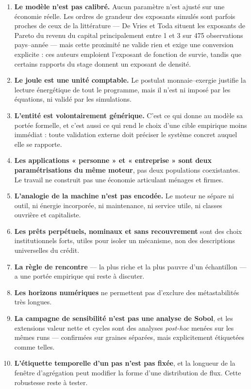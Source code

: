 \documentclass[11pt,a4paper]{article}
\begin{document}
\begin{enumerate}
\item \textbf{Le modèle n'est pas calibré.} Aucun paramètre n'est ajusté sur
      une économie réelle. Les ordres de grandeur des exposants simulés sont
      parfois proches de ceux de la littérature --- De Vries et Toda situent
      les exposants de Pareto du revenu du capital principalement entre 1 et 3
      sur 475 observations pays--année --- mais cette proximité ne valide rien
      et exige une conversion explicite : ces auteurs emploient l'exposant de
      fonction de survie, tandis que certains rapports du stage donnent un
      exposant de densité.
\item \textbf{Le joule est une unité comptable.} Le postulat monnaie--exergie
      justifie la lecture énergétique de tout le programme, mais il n'est ni
      imposé par les équations, ni validé par les simulations.
\item \textbf{L'entité est volontairement générique.} C'est ce qui donne au
      modèle sa portée formelle, et c'est aussi ce qui rend le choix d'une
      cible empirique moins immédiat : toute validation externe doit préciser
      le système concret auquel elle se rapporte.
\item \textbf{Les applications « personne » et « entreprise » sont deux
      paramétrisations du même moteur}, pas deux populations coexistantes. Le
      travail ne construit pas une économie articulant ménages et firmes.
\item \textbf{L'analogie de la machine n'est pas encodée.} Le moteur ne sépare
      ni outil, ni énergie incorporée, ni maintenance, ni service utile, ni
      classes ouvrière et capitaliste.
\item \textbf{Les prêts perpétuels, nominaux et sans recouvrement} sont des
      choix institutionnels forts, utiles pour isoler un mécanisme, non des
      descriptions universelles du crédit.
\item \textbf{La règle de rencontre} --- la plus riche et la plus pauvre d'un
      échantillon --- a une portée empirique qui reste à discuter.
\item \textbf{Les horizons numériques} ne permettent pas d'exclure des
      métastabilités très longues.
\item \textbf{La campagne de sensibilité n'est pas une analyse de Sobol}, et
      les extensions valeur nette et cycles sont des analyses \emph{post-hoc}
      menées sur les mêmes runs --- confirmées sur graines séparées, mais
      explicitement étiquetées comme telles.
\item \textbf{L'étiquette temporelle d'un pas n'est pas fixée}, et la longueur
      de la fenêtre d'agrégation peut modifier la forme d'une distribution de
      flux. Cette robustesse reste à tester.
\end{enumerate}
\end{document}
